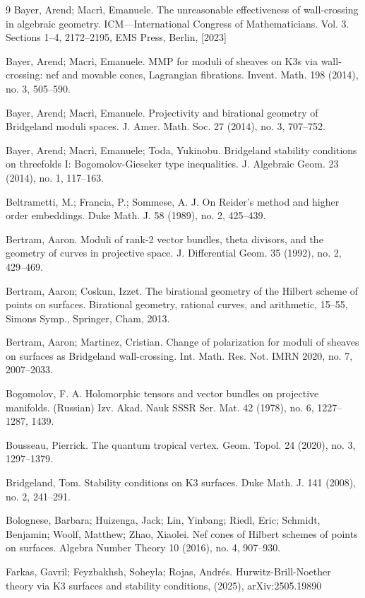 \documentclass{amsart}
\begin{document}
\begin{thebibliography}{9}
 Bayer, Arend; Macrì, Emanuele. The unreasonable effectiveness of wall-crossing in algebraic geometry. ICM—International Congress of Mathematicians. Vol. 3. Sections 1–4, 2172–2195, EMS Press, Berlin, [2023]

 Bayer, Arend; Macrì, Emanuele. MMP for moduli of sheaves on K3s via wall-crossing: nef and movable cones, Lagrangian fibrations. Invent. Math. 198 (2014), no. 3, 505–590.

 Bayer, Arend; Macrì, Emanuele. Projectivity and birational geometry of Bridgeland moduli spaces. J. Amer. Math. Soc. 27 (2014), no. 3, 707–752.

 Bayer, Arend; Macrì, Emanuele; Toda, Yukinobu. Bridgeland stability conditions on threefolds I: Bogomolov-Gieseker type inequalities. J. Algebraic Geom. 23 (2014), no. 1, 117–163.

 Beltrametti, M.; Francia, P.; Sommese, A. J. On Reider's method and higher order embeddings. Duke Math. J. 58 (1989), no. 2, 425–439. 

Bertram, Aaron. 
Moduli of rank-2 vector bundles, theta divisors, and the geometry of curves in projective space. J. Differential Geom. 35 (1992), no. 2, 429–469. 

 Bertram, Aaron; Coskun, Izzet. The birational geometry of the Hilbert scheme of points on surfaces. Birational geometry, rational curves, and arithmetic, 15–55, Simons Symp., Springer, Cham, 2013.

 Bertram, Aaron; Martinez, Cristian. Change of polarization for moduli of sheaves on surfaces as Bridgeland wall-crossing. Int. Math. Res. Not. IMRN 2020, no. 7, 2007–2033.

 Bogomolov, F. A. Holomorphic tensors and vector bundles on projective manifolds. (Russian) Izv. Akad. Nauk SSSR Ser. Mat. 42 (1978), no. 6, 1227–1287, 1439.

 Bousseau, Pierrick. The quantum tropical vertex. Geom. Topol. 24 (2020), no. 3, 1297–1379. 

 Bridgeland, Tom. Stability conditions on K3 surfaces. Duke Math. J. 141 (2008), no. 2, 241–291.

 Bolognese, Barbara; Huizenga, Jack; Lin, Yinbang; Riedl, Eric; Schmidt, Benjamin; Woolf, Matthew; Zhao, Xiaolei. Nef cones of Hilbert schemes of points on surfaces. Algebra Number Theory 10 (2016), no. 4, 907–930.


 Farkas, Gavril; Feyzbakhsh, Soheyla; Rojas, Andrés. Hurwitz-Brill-Noether theory via K3 surfaces and stability conditions, (2025), arXiv:2505.19890


\end{thebibliography}
\end{document}
